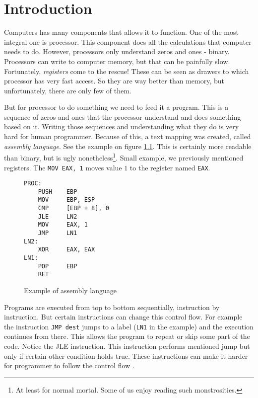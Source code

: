 \chapter{Introduction}
Computers has many components that allows it to function. One of the most integral one is processor.
This component does all the calculations that computer needs to do. However, processors only understand
zeros and ones - binary. Processors can write to computer memory, but that can be painfully slow.
Fortunately, \textit{registers} come to the rescue! These can be seen as drawers to which processor
has very fast access. So they are way better than memory, but unfortunately, there are only
few of them.

But for processor to do something we need to feed it a program. This is a sequence of zeros and ones
that the processor understand and does something based on it. Writing those sequences and understanding
what they do is very hard for human programmer. Because of this, a text mapping was created,
called \textit{assembly language}. See the example on figure \ref{fig:assembly-example}.
This is certainly more readable than binary, but is ugly nonetheless\footnote{At least for normal mortal. Some of us enjoy reading such monstrosities.}.
Small example, we previously mentioned registers. The \texttt{MOV EAX, 1} moves value $1$ to the register named \texttt{EAX}.

\begin{figure}\label{fig:assembly-example}
\begin{lstlisting}
PROC:
    PUSH    EBP
    MOV     EBP, ESP
    CMP     [EBP + 8], 0
    JLE     LN2
    MOV     EAX, 1
    JMP     LN1
LN2:
    XOR     EAX, EAX
LN1:
    POP     EBP
    RET
\end{lstlisting}
\caption{Example of assembly language}
\end{figure}

Programs are executed from top to bottom sequentially, instruction by instruction. But certain instructions can change this control flow. For example the instruction \texttt{JMP dest}
jumps to a label (\texttt{LN1} in the example) and the execution continues from there. This allows the program to repeat or skip some part of the code.
Notice the JLE instruction. This instruction performs mentioned jump but only if certain other condition holds true.
These instructions can make it harder for programmer to follow the control flow .

